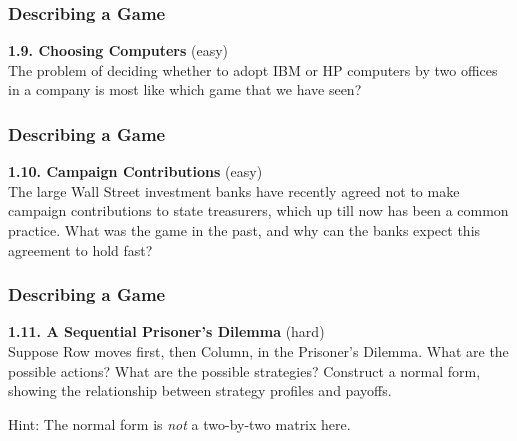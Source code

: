  \begin{frame}[fragile]\frametitle{Describing a Game}
 
 
 {\bf 1.9.       Choosing Computers} (easy)\\ 
 The problem of deciding whether to
adopt IBM or HP computers by two offices in a company is most like which  game
that we have seen?


\end{frame}
 \begin{frame}[fragile]\frametitle{Describing a Game}
 
 
 {\bf 1.10.  Campaign Contributions} (easy)\\
 The large Wall Street investment banks have recently agreed not to make
campaign contributions to state treasurers, which up till now has been a common
practice.  What was the game in the past, and why can the banks expect this
agreement to hold fast?


\end{frame}
 \begin{frame}[fragile]\frametitle{Describing a Game}


 {\bf 1.11. A Sequential Prisoner's Dilemma} (hard)\\
 Suppose Row moves first, then Column, in the Prisoner's Dilemma.  What are the
possible actions? What are the possible strategies?  Construct a normal form,
showing the relationship between strategy profiles and payoffs.


Hint: The normal form is {\it not} a two-by-two matrix here.


\end{frame}
